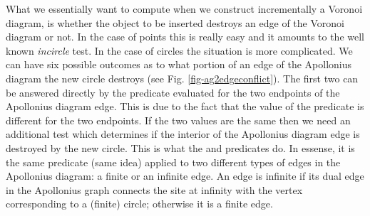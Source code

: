 What we essentially want to compute when we construct incrementally a
Voronoi diagram, is whether the object to be inserted destroys an edge
of the Voronoi diagram or not. In the case of points this is really
easy and it amounts to the well known {\em incircle} test. 
In the case
of circles the situation is more complicated. We can have six possible
outcomes as to what portion of an edge of the Apollonius diagram the
new circle destroys (see Fig. \ref{fig-ag2edgeconflict}). The first
two can be answered directly by the  predicate
evaluated for the two endpoints of the Apollonius diagram edge. This
is due to the fact that the value of the 
predicate is different for the two endpoints. If the two values are
the same then we need an additional test which determines if the interior
of the Apollonius diagram edge is destroyed by the new circle. This is
what the  and
 predicates do. In essense, it
is the same predicate (same idea) applied to two different types of
edges in the Apollonius diagram: a finite or an infinite edge. An edge
is infinite if its dual edge in the Apollonius graph connects the
site at infinity with the vertex corresponding to a (finite) circle; 
otherwise it is a finite edge.

